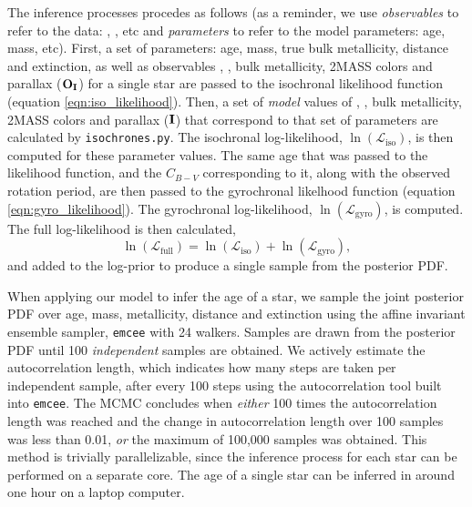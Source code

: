 The inference processes procedes as follows (as a reminder, we use {\it
observables} to refer to the data: \teff, \logg, etc and {\it parameters} to
refer to the model parameters: age, mass, etc).
First, a set of parameters: age, mass, true bulk metallicity, distance and
extinction, as well as observables \teff, \logg, bulk metallicity,
2MASS colors and parallax (${\bf O_I}$) for a single star are passed to the
isochronal likelihood function (equation \ref{eqn:iso_likelihood}).
Then, a set of {\it model} values of \teff, \logg, bulk metallicity, 2MASS
colors and parallax (${\bf I}$) that correspond to that set of parameters are
calculated by {\tt isochrones.py}.
The isochronal log-likelihood, $\ln(\mathcal{L}_{\mathrm{iso}})$, is then
computed for these parameter values.
The same age that was passed to the likelihood function, and the $C_{B-V}$
corresponding to it, along with the observed rotation period, are then passed
to the gyrochronal likelhood function (equation \ref{eqn:gyro_likelihood}).
The gyrochronal log-likelihood, $\ln(\mathcal{L}_{\mathrm{gyro}})$, is
computed.
The full log-likelihood is then calculated,
\begin{equation}
\ln(\mathcal{L}_{\mathrm{full}})
= \ln(\mathcal{L}_{\mathrm{iso}}) + \ln(\mathcal{L}_{\mathrm{gyro}}),
\label{eqn:both_likelihood}
\end{equation}
and added to the log-prior to produce a single sample from the posterior PDF.

When applying our model to infer the age of a star, we sample the joint
posterior PDF over age, mass, metallicity, distance and extinction using the
affine invariant ensemble sampler, {\tt emcee} \citep{foreman-mackey2013} with
24 walkers.
Samples are drawn from the posterior PDF until 100 {\it independent} samples
are obtained.
We actively estimate the autocorrelation length, which indicates how many
steps are taken per independent sample, after every 100 steps using the
autocorrelation tool built into {\tt emcee}.
The MCMC concludes when {\it either} 100 times the autocorrelation length was
reached and the change in autocorrelation length over 100 samples was less
than 0.01, {\it or} the maximum of 100,000 samples was obtained.
This method is trivially parallelizable, since the inference process for each
star can be performed on a separate core.
The age of a single star can be inferred in around one hour on a laptop
computer.

